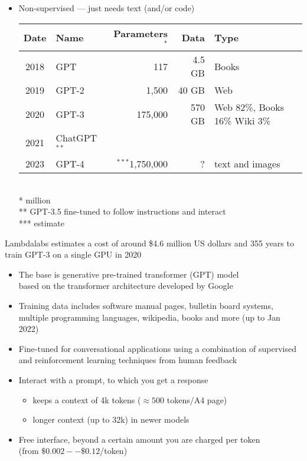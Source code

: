 \documentclass[25pt,a4paper,landscape,headrule,footrule,xetex]{foils}
\begin{document}
\begin{itemize}
\item Non-supervised --- just needs text (and/or code)
 \\[3ex]
  \begin{tabular}{clrrl}
    Date & Name & Parameters$^{*}$ & Data & Type \\ \hline
    2018 &  GPT &  117 &  4.5 GB &  Books \\
    2019 &  GPT-2 & 1,500  &  40 GB & Web \\
    2020 &  GPT-3 &  175,000 &  570 GB &
      Web 82\%, Books 16\%  Wiki 3\% \\ 
    2021 & ChatGPT$^{**}$ \\
    2023 & GPT-4 & {$^{***}$}1,750,000 & ? &  text and images
  \end{tabular}
  \\ {*} million
  \\ {**}  GPT-3.5 fine-tuned to follow instructions and interact
  \\ {***} estimate
\end{itemize}

Lambdalabs estimates a cost of around \$4.6 million US dollars and 355 years to train GPT-3 on a single GPU in 2020


\begin{itemize}
\item The base is generative pre-trained transformer (GPT) model
  \\ based on the transformer architecture developed by Google
\item Training data includes software manual pages, bulletin board systems, multiple programming languages, wikipedia, books and more (up to Jan 2022)
  \item Fine-tuned for conversational applications using a combination
  of supervised and reinforcement learning techniques from human feedback
\item Interact with a prompt, to which you get a response
  \begin{itemize}
  \item  keeps a context of 4k tokens ($\approx 500$ tokens/A4 page)
  \item  longer context (up to 32k) in newer models
  \end{itemize}
\item Free interface, beyond a certain amount you are charged per
  token
  \\ (from   $\$0.002--\$0.12$/token)        
  
\end{itemize}
\end{document}
